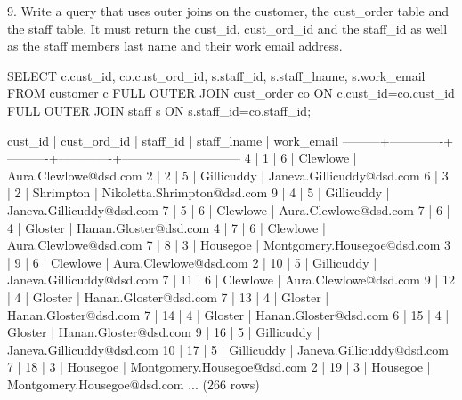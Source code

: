 9. Write a query that uses outer joins on the customer, the cust\_order table and the staff table. It must return the cust\_id, cust\_ord\_id and the staff\_id as well as the staff members last name and their work email address.
\begin{sql}
SELECT c.cust_id, co.cust_ord_id, s.staff_id, s.staff_lname, s.work_email FROM customer c
FULL OUTER JOIN cust_order co ON c.cust_id=co.cust_id
FULL OUTER JOIN staff s ON s.staff_id=co.staff_id;
\end{sql}
\begin{pseudo*}
 cust_id | cust_ord_id | staff_id | staff_lname |         work_email
---------+-------------+----------+-------------+-----------------------------
       4 |           1 |        6 | Clewlowe    | Aura.Clewlowe@dsd.com
       2 |           2 |        5 | Gillicuddy  | Janeva.Gillicuddy@dsd.com
       6 |           3 |        2 | Shrimpton   | Nikoletta.Shrimpton@dsd.com
       9 |           4 |        5 | Gillicuddy  | Janeva.Gillicuddy@dsd.com
       7 |           5 |        6 | Clewlowe    | Aura.Clewlowe@dsd.com
       7 |           6 |        4 | Gloster     | Hanan.Gloster@dsd.com
       4 |           7 |        6 | Clewlowe    | Aura.Clewlowe@dsd.com
       7 |           8 |        3 | Housegoe    | Montgomery.Housegoe@dsd.com
       3 |           9 |        6 | Clewlowe    | Aura.Clewlowe@dsd.com
       2 |          10 |        5 | Gillicuddy  | Janeva.Gillicuddy@dsd.com
       7 |          11 |        6 | Clewlowe    | Aura.Clewlowe@dsd.com
       9 |          12 |        4 | Gloster     | Hanan.Gloster@dsd.com
       7 |          13 |        4 | Gloster     | Hanan.Gloster@dsd.com
       7 |          14 |        4 | Gloster     | Hanan.Gloster@dsd.com
       6 |          15 |        4 | Gloster     | Hanan.Gloster@dsd.com
       9 |          16 |        5 | Gillicuddy  | Janeva.Gillicuddy@dsd.com
      10 |          17 |        5 | Gillicuddy  | Janeva.Gillicuddy@dsd.com
       7 |          18 |        3 | Housegoe    | Montgomery.Housegoe@dsd.com
       2 |          19 |        3 | Housegoe    | Montgomery.Housegoe@dsd.com
...
(266 rows)
\end{pseudo*}

